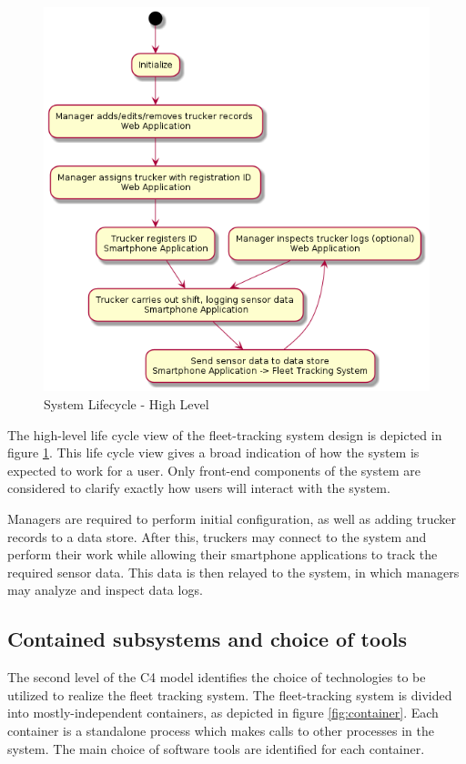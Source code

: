 \begin{figure}
\centering
\includegraphics[scale=0.65]{high_level_activity.png}
\caption{System Lifecycle - High Level}
\label{fig:high_level_activity}
\end{figure}
The high-level life cycle view of the fleet-tracking system design is depicted in figure \ref{fig:high_level_activity}.
This life cycle view gives a broad indication of how the system is expected to work for a user.
Only front-end components of the system are considered to clarify exactly how users will interact with the system.

Managers are required to perform initial configuration, as well as adding trucker records to a data store.
After this, truckers may connect to the system and perform their work while allowing their smartphone applications to track the required sensor data. 
This data is then relayed to the system, in which managers may analyze and inspect data logs.

\subsection{Contained subsystems and choice of tools}
The second level of the C4 model identifies the choice of technologies to be utilized to realize the fleet tracking system.
The fleet-tracking system is divided into mostly-independent containers, as depicted in figure \ref{fig:container}.
Each container is a standalone process which makes calls to other processes in the system.
The main choice of software tools are identified for each container.

